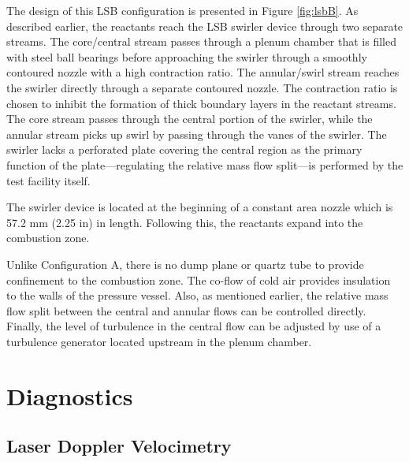 

The design of this LSB configuration is presented in Figure \ref{fig:lsbB}.
As described earlier, the reactants reach the LSB swirler device through two separate streams.
The core/central stream passes through a plenum chamber that is filled with steel ball bearings before approaching the swirler through a smoothly contoured nozzle with a high contraction ratio.
The annular/swirl stream reaches the swirler directly through a separate contoured nozzle.
The contraction ratio is chosen to inhibit the formation of thick boundary layers in the reactant streams.
The core stream passes through the central portion of the swirler, while the annular stream picks up swirl by passing through the vanes of the swirler.
The swirler lacks a perforated plate covering the central region as the primary function of the plate---regulating the relative mass flow split---is performed by the test facility itself.

The swirler device is located at the beginning of a constant area nozzle which is 57.2 mm (2.25 in) in length.
Following this, the reactants expand into the combustion zone.

Unlike Configuration A, there is no dump plane or quartz tube to provide confinement to the combustion zone.
The co-flow of cold air provides insulation to the walls of the pressure vessel.
Also, as mentioned earlier, the relative mass flow split between the central and annular flows can be controlled directly.
Finally, the level of turbulence in the central flow can be adjusted by use of a turbulence generator\cite{2011-marshall} located upstream in the plenum chamber.

\section{Diagnostics}
\label{sec:experimental-diagnostics}

\subsection{Laser Doppler Velocimetry}
\label{subsec:experimental-laser-doppler-velocimetry}



